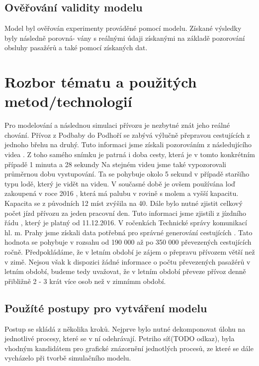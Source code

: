 \documentclass[11pt,a4paper]{article}
\begin{document}
	\subsection{Ověřování validity modelu}
  Model byl ověřován experimenty prováděné pomocí modelu. Získané výsledky byly následně porovná-
  vány s reálnými údaji získanými na základě pozorování obsluhy pasažérů \cite{DELKA_CESTY} a také pomocí získaných dat. \cite{ROCENKY}

	\section{Rozbor tématu a použitých metod/technologií}
  Pro modelování a následnou simulaci přívozu je nezbytné znát jeho reálné chování.
  Přívoz z Podbaby do Podhoří se zabývá výlučně přepravou cestujících z jednoho
  břehu na druhý. Tuto informaci jsme získali pozorováním z následujícího videa \cite{DELKA_CESTY}.
  Z toho samého snímku je patrná i doba cesty, která je v tomto konkrétním případě 1 minuta a 28 sekundy
  Na stejném videu jsme také vypozorovali průměrnou dobu vystupování. Ta se pohybuje
  okolo 5 sekund v případě staršího typu lodě, který je vidět na videu. V současné době je ovšem používána loď zakoupená
  v roce 2016 \cite{LOD}, která má palubu v rovině s molem a vyšší kapacitu. Kapacita se z původních 12 míst zvýšila na
  40. Dále bylo nutné zjistit celkový počet jízd přívozu za jeden pracovní den. Tuto informaci
  jsme zjistili z jízdního řádu \cite{PID}, který je platný od 11.12.2016.
  V ročenkách Technické správy komunikací hl. m. Prahy jsme získali data potřebná pro
  správné generování cestujících \cite{ROCENKY}. Tato hodnota se pohybuje v rozsahu od 190 000
  až po 350 000 převezených cestujících ročně. Předpokládáme, že v letním období je
  zájem o přepravu přívozem větší než v zimě. Nejsou však k dispozici žádné informace o
  počtu převezených pasažérů v letním období, budeme tedy uvažovat, že v letním období
  převeze přívoz denně přibližně 2 - 3 krát více osob než v zimnímm období.

  \subsection{Použíté postupy pro vytváření modelu}
  Postup se skládá z několika kroků. Nejprve bylo nutné dekomponovat úlohu na jednotlivé procesy,
  které se v ní odehrávají. Petriho síť(TODO odkaz), byla vhodným kandidátem pro grafické znázornění
  jednotlých procesů, ze které se dále vycházelo při tvorbě simulačního modelu.
\end{document}

